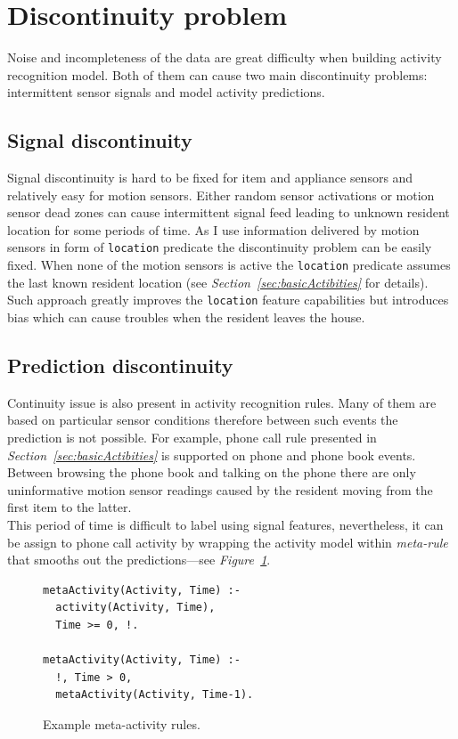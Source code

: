 \documentclass[10pt, a4paper, pdflatex, leqno, twoside, openright]{report}
\begin{document}
  \section{Discontinuity problem\label{sec:predictionDiscontinuity}}
Noise and incompleteness of the data are great difficulty when building activity recognition model. Both of them can cause two main discontinuity problems: intermittent sensor signals and model activity predictions.

    \subsection{Signal discontinuity}
Signal discontinuity is hard to be fixed for item and appliance sensors and relatively easy for motion sensors. Either random sensor activations or motion sensor dead zones can cause intermittent signal feed leading to unknown resident location for some periods of time. As I use information delivered by motion sensors in form of \texttt{location} predicate the discontinuity problem can be easily fixed. When none of the motion sensors is active the \texttt{location} predicate assumes the last known resident location (see \emph{Section~\ref{sec:basicActibities}} for details). Such approach greatly improves the \texttt{location} feature capabilities but introduces bias which can cause troubles when the resident leaves the house.

    \subsection{Prediction discontinuity}
Continuity issue is also present in activity recognition rules. Many of them are based on particular sensor conditions therefore between such events the prediction is not possible. For example, phone call rule presented in \emph{Section~\ref{sec:basicActibities}} is supported on phone and phone book events. Between browsing the phone book and talking on the phone there are only uninformative motion sensor readings caused by the resident moving from the first item to the latter.\\
This period of time is difficult to label using signal features, nevertheless, it can be assign to phone call activity by wrapping the activity model within \emph{meta-rule} that smooths out the predictions---see \emph{Figure~\ref{lst:metaActivity}}.

\begin{figure}[htb]
  \begin{verbatim}
metaActivity(Activity, Time) :-
  activity(Activity, Time),
  Time >= 0, !.

metaActivity(Activity, Time) :-
  !, Time > 0,
  metaActivity(Activity, Time-1).
  \end{verbatim}
  \caption{Example meta-activity rules.\label{lst:metaActivity}}
\end{figure}
\end{document}
